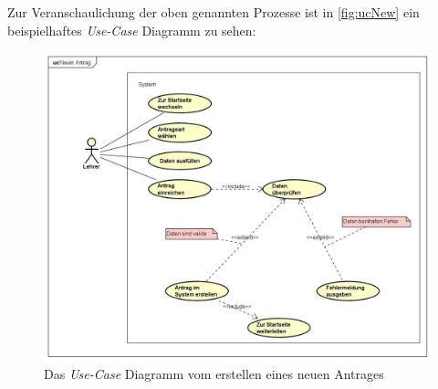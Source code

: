 Zur Veranschaulichung der oben genannten Prozesse ist in \autoref{fig:ucNew} ein beispielhaftes \textit{Use-Case} Diagramm zu sehen: 
\begin{figure}[H]
	\centering
	\includegraphics[width=1\linewidth]{images/ldehner_konzept/uc-new}
	\caption[\textit{Use-Case} Diagramm Neuer Antrag]{Das \textit{Use-Case} Diagramm vom erstellen eines neuen Antrages}
	\label{fig:ucNew}
\end{figure}
\newpage
